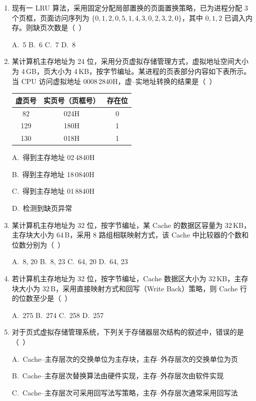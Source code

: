 \documentclass[12pt,a4paper]{ctexart}
\begin{document}
\begin{enumerate}[leftmargin=*]
A.~1 \quad B.~256 \quad C.~256K \quad D.~256M

\item 现有一 LRU 算法，采用固定分配局部置换的页面置换策略，已为进程分配 3 个页框，页面访问序列为 $\{0,1,2,0,5,1,4,3,0,2,3,2,0\}$，其中 $0,1,2$ 已调入内存。则缺页次数是（~）

A.~5 \quad B.~6 \quad C.~7 \quad D.~8

\item 某计算机主存地址为 24 位，采用分页虚拟存储管理方式，虚拟地址空间大小为 4\,GB，页大小为 4\,KB，按字节编址。某进程的页表部分内容如下表所示。当 CPU 访问虚拟地址 0008\,2840H，虚--实地址转换的结果是（~）

\begin{center}
\begin{tabular}{|c|c|c|}
\hline
虚页号 & 实页号（页框号） & 存在位 \\
\hline
82   & 024H & 0 \\
\hline
129  & 180H & 1 \\
\hline
130  & 018H & 1 \\
\hline
\end{tabular}
\end{center}

A.~得到主存地址 02\,4840H

B.~得到主存地址 18\,0840H

C.~得到主存地址 01\,8840H

D.~检测到缺页异常

\item 某计算机主存地址为 32 位，按字节编址，某 Cache 的数据区容量为 32\,KB，主存块大小为 64\,B，采用 8 路组相联映射方式，该 Cache 中比较器的个数和位数分别为（~）

A.~8, 20 \quad B.~8, 23 \quad C.~64, 20 \quad D.~64, 23

\item 若计算机主存地址为 32 位，按字节编址，Cache 数据区大小为 32\,KB，主存块大小为 32\,B，采用直接映射方式和回写（Write Back）策略，则 Cache 行的位数至少是（~）

A.~275 \quad B.~274 \quad C.~258 \quad D.~257

\item 对于页式虚拟存储管理系统，下列关于存储器层次结构的叙述中，错误的是（~）

A.~Cache--主存层次的交换单位为主存块，主存--外存层次的交换单位为页

B.~Cache--主存层次替换算法由硬件实现，主存--外存层次由软件实现

C.~Cache--主存层次可采用回写法写策略，主存--外存层次通常采用回写法


\end{enumerate}
\end{document}
